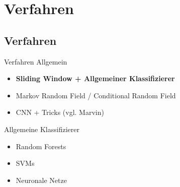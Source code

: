 \section{Verfahren}
\subsection{Verfahren}

\begin{frame}{Verfahren}
    Allgemein
    \begin{itemize}
        \item \textbf{Sliding Window + Allgemeiner Klassifizierer}
        \item Markov Random Field / Conditional Random Field
        \item CNN + Tricks (vgl. Marvin)
    \end{itemize}

    Allgemeine Klassifizierer
    \begin{itemize}
        \item Random Forests
        \item SVMs
        \item Neuronale Netze
    \end{itemize}
\end{frame}
